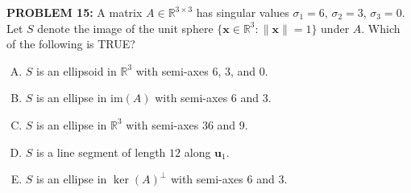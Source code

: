 \documentclass[12pt]{amsart}
\begin{document}
{\bf PROBLEM 15:}
%
A matrix $A \in \mathbb{R}^{3 \times 3}$ has singular values $\sigma_1 = 6$, $\sigma_2 = 3$, $\sigma_3 = 0$. Let $S$ denote the image of the unit sphere $\{\mathbf{x} \in \mathbb{R}^3 : \|\mathbf{x}\| = 1\}$ under $A$. Which of the following is TRUE?

\begin{enumerate}[(A)]
\item $S$ is an ellipsoid in $\mathbb{R}^3$ with semi-axes $6$, $3$, and $0$.
\item $S$ is an ellipse in $\mathrm{im}(A)$ with semi-axes $6$ and $3$.
\item $S$ is an ellipse in $\mathbb{R}^3$ with semi-axes $36$ and $9$.
\item $S$ is a line segment of length $12$ along $\mathbf{u}_1$.
\item $S$ is an ellipse in $\ker(A)^\perp$ with semi-axes $6$ and $3$.
\end{enumerate}

%
%
\end{document}

